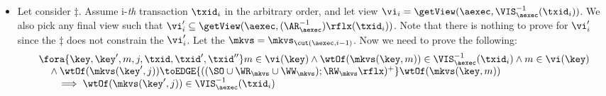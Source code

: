 \begin{itemize}
\item Let consider \( \ddagger \).
Assume i-\emph{th} transaction \( \txid_i \) in the arbitrary order,
and let view \( \vi_{i} = \getView(\aexec, \VIS^{-1}_{\aexec}(\txid_{i}) ) \).
We also pick any final view such that \( \vi'_{i} \subseteq \getView(\aexec, (\AR^{-1}_{\aexec})\rflx(\txid_{i}) ) \).
Note that there is nothing to prove for \( \vi'_i \) since the \( \ddagger \) does not constrain the \( \vi'_i \).
Let the \( \mkvs = \mkvs_{\cut(\aexec, i-1)} \).
Now we need to prove the following:
\begin{gather}
    \label{equ:si-complete-arvis}
    \begin{array}{@{}l@{}}
        \fora{\key, \key', m, j, \txid, \txid', \txid''} 
        m \in \vi(\key) 
        \land \wtOf(\mkvs(\key,m)) \in \VIS^{-1}_{\aexec}(\txid_{i})
        \land m \in \vi(\key)  \\
        \quad {} \wedge \wtOf(\mkvs(\key', j)) \toEDGE{((\SO \cup \WR_{\mkvs} \cup \WW_{\mkvs}) ; \RW_{\mkvs}\rflx)^{+}} \wtOf(\mkvs(\key, m)) \\
        \qquad \implies \wtOf(\mkvs(\key',j)) \in \VIS^{-1}_{\aexec}(\txid_{i})
    \end{array} 
\end{gather}

\end{itemize}
